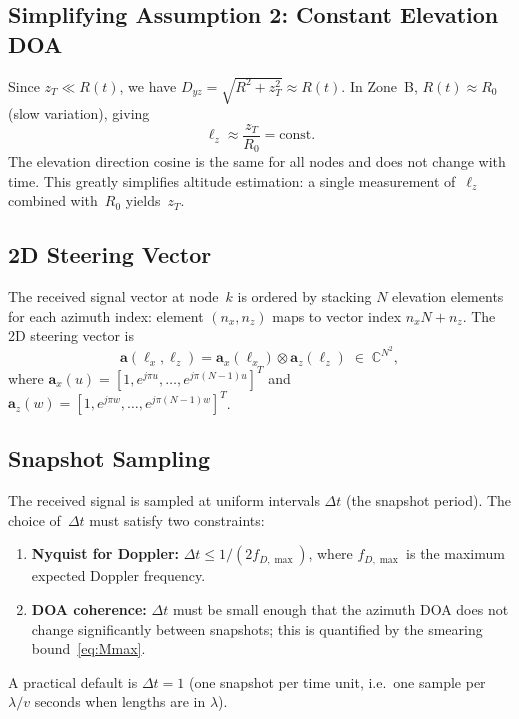\documentclass[11pt,a4paper]{article}
\newcommand{\C}{\mathbb{C}}
\begin{document}
\subsection{Simplifying Assumption 2: Constant Elevation DOA}
\label{sec:assumption2}

Since $z_T\ll R(t)$, we have
$D_{yz}=\sqrt{R^2+z_T^2}\approx R(t)$.  In Zone~B,
$R(t)\approx R_0$ (slow variation), giving
\begin{equation}
  \boxed{\ell_z\approx\frac{z_T}{R_0}=\text{const}.}
  \label{eq:lz_const}
\end{equation}
The elevation direction cosine is the same for all nodes and does
not change with time.  This greatly simplifies altitude estimation:
a single measurement of~$\ell_z$ combined with~$R_0$ yields~$z_T$.

\subsection{2D Steering Vector}

The received signal vector at node~$k$ is ordered by stacking $N$
elevation elements for each azimuth index: element $(n_x,n_z)$ maps
to vector index $n_x N+n_z$.  The 2D steering vector is
\begin{equation}
  \mathbf{a}(\ell_x,\ell_z)=\mathbf{a}_x(\ell_x)\otimes
  \mathbf{a}_z(\ell_z)\;\in\;\C^{N^2},
  \label{eq:steering}
\end{equation}
where
$\mathbf{a}_x(u)=[1,e^{j\pi u},\ldots,e^{j\pi(N-1)u}]^T$ and
$\mathbf{a}_z(w)=[1,e^{j\pi w},\ldots,e^{j\pi(N-1)w}]^T$.

\subsection{Snapshot Sampling}
\label{sec:snapshot}

The received signal is sampled at uniform intervals
$\Delta t$ (the snapshot period).  The choice of~$\Delta t$ must
satisfy two constraints:
\begin{enumerate}
  \item \textbf{Nyquist for Doppler:}
    $\Delta t\le 1/(2f_{D,\max})$, where
    $f_{D,\max}$ is the maximum expected Doppler frequency.
  \item \textbf{DOA coherence:} $\Delta t$ must be small enough
    that the azimuth DOA does not change significantly between
    snapshots; this is quantified by the smearing
    bound~\eqref{eq:Mmax}.
\end{enumerate}
A practical default is $\Delta t=1$ (one snapshot per time unit,
i.e.\ one sample per $\lambda/v$ seconds when lengths are in
$\lambda$).
\end{document}

